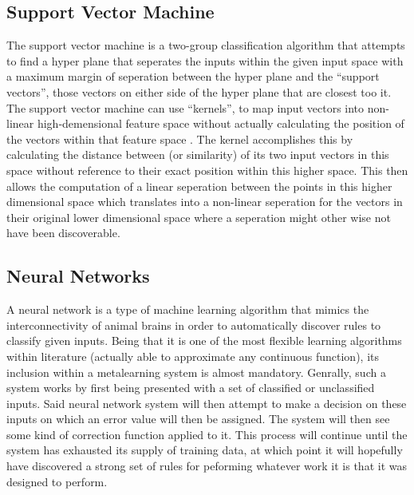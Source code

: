 \documentclass[a4paper,11pt]{article}
\begin{document}
\subsection{Support Vector Machine}
The support vector machine is a two-group classification algorithm that attempts to find a hyper
plane that seperates the inputs within the given input space with a maximum margin of seperation
between the hyper plane and the ``support vectors'', those vectors on either side of the hyper plane
that are closest too it. The support vector machine can use ``kernels'', to map input vectors into
non-linear high-demensional feature space without actually calculating the position of
the vectors within that feature space \cite{Vapnik}. The kernel accomplishes this by calculating the
distance between (or similarity) of its two input vectors in this space without reference to their exact
position within this higher space. This then allows the computation of a linear seperation between
the points in this higher dimensional space which translates into a non-linear seperation for the
vectors in their original lower dimensional space where a seperation might other wise not have been
discoverable.

\subsection{Neural Networks}
A neural network is a type of machine learning algorithm that mimics
the interconnectivity of animal brains in order to automatically
discover rules to classify given inputs. Being that it is one of the most
flexible learning algorithms within literature (actually able to
approximate any continuous function)\cite{Hornik}, its inclusion within a
metalearning system is almost mandatory.  Genrally, such a system
works by first being presented with a set of classified or
unclassified inputs. Said neural network system will then attempt to
make a decision on these inputs on which an error value will then be
assigned. The system will then see some kind of correction function
applied to it. This process will continue until the system has
exhausted its supply of training data, at which point it will
hopefully have discovered a strong set of rules for peforming whatever
work it is that it was designed to perform.
\end{document}
